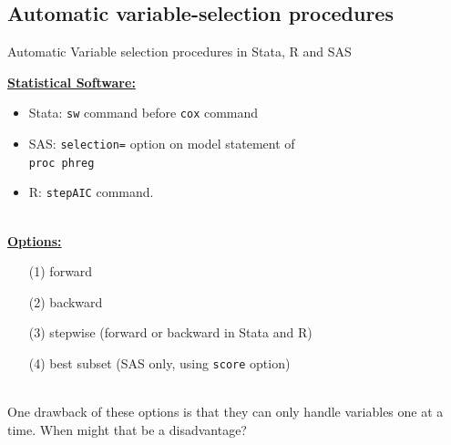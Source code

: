 \documentclass[envcountsect, 10pt, portrait, palatino]{beamer}
\begin{document}
\subsection{Automatic variable-selection procedures}
\begin{frame}{Automatic Variable selection procedures in Stata, R and SAS}

\underline{\bf Statistical Software:}
\begin{itemize}
\item Stata: {\tt sw} command before {\tt cox} command
\item SAS: {\tt selection=} option on model statement of \\{\tt proc phreg}
\item R: {\tt stepAIC} command.
\end{itemize}
~\\
\underline{\bf Options:}
\begin{itemize}
\item[(1)] forward
\item[(2)] backward
\item[(3)] stepwise (forward or backward in Stata and R)
\item[(4)] best subset (SAS only, using {\tt score} option)
\end{itemize}
~\\
One drawback of these options is that they can only handle
variables one at a time.  When might that be a disadvantage?
\end{frame}
\end{document}
